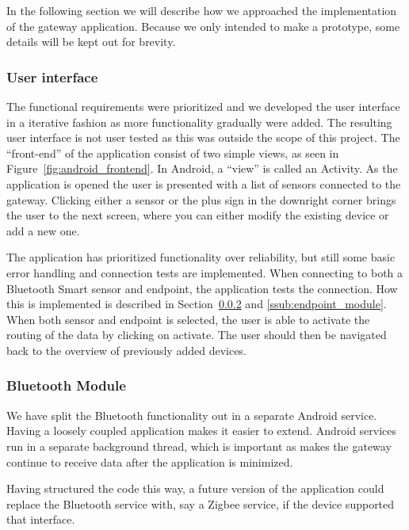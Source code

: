 In the following section we will describe how we approached the implementation of the gateway application. Because we only intended to make a prototype, some details will be kept out for brevity. 

\subsubsection{User interface} %
\label{ssub:the_user_interface}

The functional requirements were prioritized and we developed the user interface in a iterative fashion as more functionality gradually were added. The resulting user interface is not user tested as this was outside the scope of this project. The ``front-end'' of the application consist of two simple views, as seen in Figure~\ref{fig:android_frontend}. In Android, a ``view'' is called an Activity. As the application is opened the user is presented with a list of sensors connected to the gateway. Clicking either a sensor or the plus sign in the downright corner brings the user to the next screen, where you can either modify the existing device or add a new one. 

The application has prioritized functionality over reliability, but still some basic error handling and connection tests are implemented. When connecting to both a Bluetooth Smart sensor and endpoint, the application tests the connection. How this is implemented is described in Section~\ref{ssub:bluetooth_module} and \ref{ssub:endpoint_module}. When both sensor and endpoint is selected, the user is able to activate the routing of the data by clicking on activate. The user should then be navigated back to the overview of previously added devices.


\subsubsection{Bluetooth Module} %
\label{ssub:bluetooth_module}


We have split the Bluetooth functionality out in a separate Android service. Having a loosely coupled application makes it easier to extend. Android services run in a separate background thread, which is important as makes the gateway continue to receive data after the application is minimized.

Having structured the code this way, a future version of the application could replace the Bluetooth service with, say a Zigbee service, if the device supported that interface.

